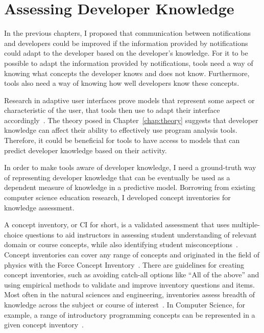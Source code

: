 \chapter{Assessing Developer Knowledge}
\label{chap:assess}

In the previous chapters, I proposed that communication between notifications and developers could be improved if the information provided by notifications could adapt to the developer based on the developer's knowledge. 	
For it to be possible to adapt the information provided by notifications, tools need a way of knowing what concepts the developer knows and does not know. Furthermore, tools also need a way of knowing how well developers know these concepts. 

Research in adaptive user interfaces prove models that represent some aspect or characteristic of the user, that tools then use to adapt their interface accordingly~\cite{murray1999authoring, schlungbaum1996model}. The theory posed in Chapter~\ref{chap:theory} suggests that developer knowledge can affect their ability to effectively use program analysis tools. Therefore, it could be beneficial for tools to have access to models that can predict developer knowledge based on their activity.

In order to make tools aware of developer knowledge, I need a ground-truth way of representing developer knowledge that can be eventually be used as a dependent measure of knowledge in a predictive model. Borrowing from existing computer science education research, I developed concept inventories for knowledge assessment. 

A concept inventory, or CI for short, is a validated assessment that uses multiple-choice questions to aid instructors in assessing student understanding of relevant domain or course concepts, while also identifying student misconceptions~\cite{evans2003progress}. Concept inventories can cover any range of concepts and originated in the field of physics with the Force Concept Inventory~\cite{hestenes1992force}. There are guidelines for creating concept inventories, such as avoiding catch-all options like ``All of the above'' and using empirical methods to validate and improve inventory questions and items. Most often in the natural sciences and engineering, inventories assess breadth of knowledge across the subject or course of interest~\cite{evans2003progress}. In Computer Science, for example, a range of introductory programming concepts can be represented in a given concept inventory~\cite{tew2010developing}.

